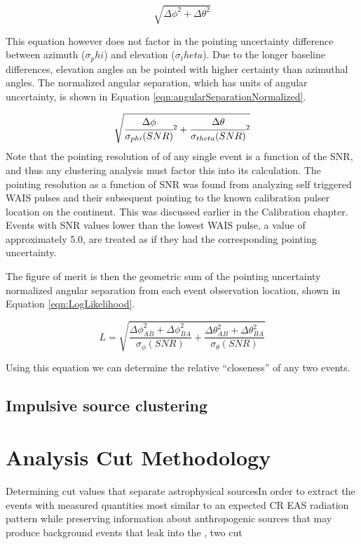 	\begin{equation}
		\sqrt{\Delta\phi^2 + \Delta\theta^2}
		\label{eqn:angularSeparation}
	\end{equation}
	
	This equation however does not factor in the pointing uncertainty difference between azimuth ($\sigma_phi$) and elevation ($\sigma_theta$). Due to the longer baseline differences, elevation angles an be pointed with higher certainty than azimuthal angles.  The normalized angular separation, which has units of angular uncertainty, is shown in Equation \ref{eqn:angularSeparationNormalized}.
	
	\begin{equation}
		\sqrt{\cfrac{\Delta\phi}{\sigma_{phi}(SNR)}^2 + \cfrac{\Delta\theta}{\sigma_{theta}(SNR)}^2}
		\label{eqn:angularSeparationNormalized}
	\end{equation}
		Note that the pointing resolution  of of any single event is a function of the SNR, and thus any clustering analysis must factor this into its calculation.  The pointing resolution as a function of SNR was found from analyzing self triggered WAIS pulses and their subsequent pointing to the known calibration pulser location on the continent.  This was discussed earlier in the Calibration chapter.  Events with SNR values lower than the lowest WAIS pulse, a value of approximately 5.0, are treated as if they had the corresponding pointing uncertainty.
		
		The figure of merit is then the geometric sum of the pointing uncertainty normalized angular separation from each event observation location, shown in Equation \ref{eqn:LogLikelihood}.
		
	\begin{equation}
		L = \sqrt{\frac{\Delta\phi_{AB}^2   + \Delta\phi_{BA}^2}{\sigma_{\phi}(SNR)} + \frac{\Delta\theta_{AB}^2 + \Delta\theta_{BA}^2}{\sigma_{\theta}(SNR)}}
		\label{eqn:LogLikelihood}
	\end{equation}


		Using this equation we can determine the relative ``closeness'' of any two events.  
		
	
	\subsection{Impulsive source clustering}
	



\section{Analysis Cut Methodology}
	Determining cut values that separate astrophysical sourcesIn order to extract the events with measured quantities most similar to an expected CR EAS radiation pattern while preserving information about anthropogenic sources that may produce background events that leak into the , two cut 